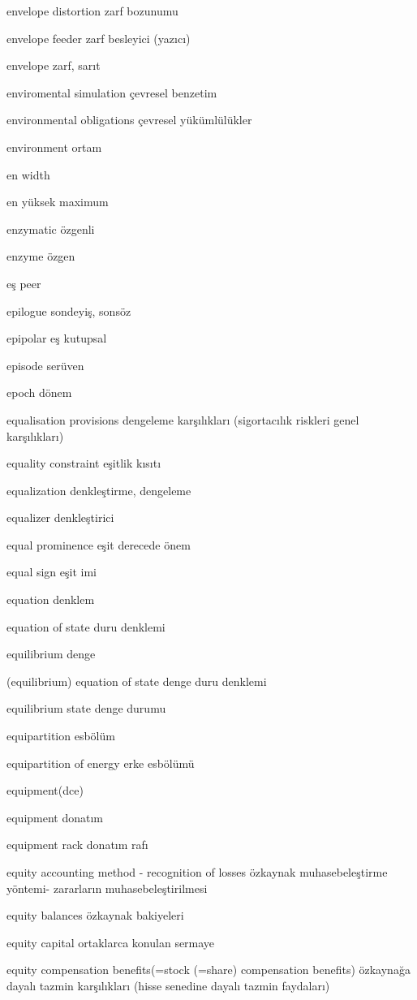 \documentclass[12pt,fleqn]{article}\usepackage{../../common}
\begin{document}
envelope distortion zarf bozunumu

envelope feeder zarf besleyici (yazıcı)

envelope zarf, sarıt

enviromental simulation çevresel benzetim

environmental obligations çevresel yükümlülükler

environment ortam

en width

en yüksek maximum

enzymatic özgenli

enzyme özgen

eş peer

epilogue sondeyiş, sonsöz

epipolar eş kutupsal

episode serüven

epoch dönem

equalisation provisions dengeleme karşılıkları (sigortacılık riskleri genel karşılıkları)

equality constraint eşitlik kısıtı

equalization denkleştirme, dengeleme

equalizer denkleştirici

equal prominence eşit derecede önem

equal sign eşit imi

equation denklem

equation of state duru denklemi

equilibrium denge

(equilibrium) equation of state denge duru denklemi

equilibrium state denge durumu

equipartition esbölüm

equipartition of energy erke esbölümü

equipment(dce)

equipment donatım

equipment rack donatım rafı

equity accounting method - recognition of losses özkaynak muhasebeleştirme yöntemi- zararların muhasebeleştirilmesi

equity balances özkaynak bakiyeleri

equity capital ortaklarca konulan sermaye

equity compensation benefits(=stock (=share) compensation benefits) özkaynağa dayalı tazmin karşılıkları (hisse senedine dayalı tazmin faydaları)
\end{document}
